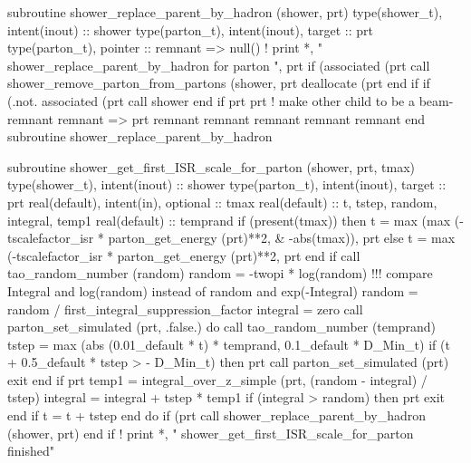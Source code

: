 \eatline
\nwendcode{}\nwdocspar
\nwenddocs{}\plusendmoddef
  subroutine shower_replace_parent_by_hadron (shower, prt)
    type(shower_t), intent(inout) :: shower
    type(parton_t), intent(inout), target :: prt
    type(parton_t), pointer :: remnant => null()
    ! print *, " shower_replace_parent_by_hadron for parton ", prt%
    if (associated (prt%
       call shower_remove_parton_from_partons (shower, prt%
       deallocate (prt%
    end if
    if (.not. associated (prt%
       call shower%
    end if
    prt%
    prt%
    ! make other child to be a beam-remnant
    remnant => prt%
    remnant%
    remnant%
    remnant%
    remnant%
    remnant%
  end subroutine shower_replace_parent_by_hadron

\eatline
\nwendcode{}\nwdocspar
\nwenddocs{}\plusendmoddef
  subroutine shower_get_first_ISR_scale_for_parton (shower, prt, tmax)
    type(shower_t), intent(inout) :: shower
    type(parton_t), intent(inout), target :: prt
    real(default), intent(in), optional :: tmax
    real(default) :: t, tstep, random, integral, temp1
    real(default) :: temprand
    if (present(tmax)) then
       t = max (max (-tscalefactor_isr * parton_get_energy (prt)**2, &
            -abs(tmax)), prt%
    else
       t = max (-tscalefactor_isr * parton_get_energy (prt)**2, prt%
    end if
    call tao_random_number (random)
    random = -twopi * log(random)
    !!! compare Integral and log(random) instead of random and exp(-Integral)
    random = random / first_integral_suppression_factor
    integral = zero
    call parton_set_simulated (prt, .false.)
    do
       call tao_random_number (temprand)
       tstep = max (abs (0.01_default * t) * temprand, 0.1_default * D_Min_t)
       if (t + 0.5_default * tstep > - D_Min_t) then
          prt%
          call parton_set_simulated (prt)
          exit
       end if
       prt%
       temp1 = integral_over_z_simple (prt, (random - integral) / tstep)
       integral = integral + tstep * temp1
       if (integral > random) then
          prt%
          exit
       end if
       t = t + tstep
    end do
    if (prt%
       call shower_replace_parent_by_hadron (shower, prt)
    end if
    ! print *, "  shower_get_first_ISR_scale_for_parton finished"

